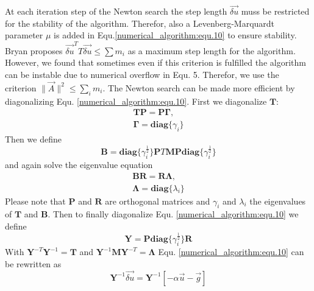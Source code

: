 \documentclass[10pt,letterpaper]{article}
\begin{document}
At each iteration step of the Newton search the step length $\vec{\delta u}$ muss be restricted for the stability of the algorithm.
Therefor, also a Levenberg-Marquardt parameter $\mu$ is added in Equ.\ref{numerical_algorithm:equ.10} to ensure stability.
Bryan proposes $\vec{\delta u}^T T \vec{\delta u} \leq \sum m_i$ as a maximum step length for the algorithm.
However, we found that sometimes even if this criterion is fulfilled the algorithm can be instable due to numerical overflow in Equ. 5.
Therefor, we use the criterion $\parallel \vec A \parallel^2 \leq \sum_i m_i$.
The Newton search can be made more efficient by diagonalizing Equ. \ref{numerical_algorithm:equ.10}. First we diagonalize $\mathbf{T}$:
\begin{equation}
	\begin{gathered}
		\mathbf{T} \mathbf{P} = \mathbf{P} \mathbf{\Gamma},\\
		\mathbf{\Gamma} = \mathbf{diag} \{\gamma_i\}
	\end{gathered}
	\label{numerical_algorithm:equ.11}
\end{equation}
Then we define
\begin{equation}
	\mathbf{B} = \mathbf{diag} \{ \gamma_i^{\frac{1}{2}}\}\mathbf{P}T \mathbf{M}\mathbf{P}\mathbf{diag}\{ \gamma_i^{\frac{1}{2}}\}
	\label{numerical_algorithm:equ.12}
\end{equation}
and again solve the eigenvalue equation
\begin{equation}
	\begin{gathered}
		\mathbf{B} \mathbf{R} = \mathbf{R} \mathbf{\Lambda},\\
		\mathbf{\Lambda} = \mathbf{diag} \{\lambda_i\}
	\end{gathered}
	\label{numerical_algorithm:equ.13}
\end{equation}
Please note that $\mathbf{P}$ and $\mathbf{R}$ are orthogonal matrices and $\gamma_i$ and $\lambda_i$ the eigenvalues of $\mathbf{T}$ and $\mathbf{B}$. Then to finally diagonalize Equ. \ref{numerical_algorithm:equ.10} we define 
\begin{equation}
	\mathbf{Y} = \mathbf{P} \mathbf{diag}\{ \gamma_i^{\frac{1}{2}}\} \mathbf{R}
	\label{numerical_algorithm:equ.14}
\end{equation}
With $\mathbf{Y}^{-T}\mathbf{Y}^{-1} = \mathbf{T}$ and $\mathbf{Y}^{-1}\mathbf{M}\mathbf{Y}^{-T} = \mathbf{\Lambda}$ Equ. \ref{numerical_algorithm:equ.10} can be rewritten as
\begin{equation}
	[( \alpha + \mu) \mathbf{I} +\mathbf{\Lambda}]\mathbf{Y}^{-1} \vec{\delta u} = \mathbf{Y}^{-1}[ -\alpha \vec u - \vec g]
	\label{numerical_algorithm:equ.15}
\end{equation}
\end{document}
